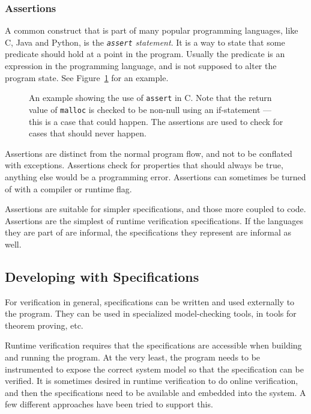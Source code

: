 \documentclass[a4paper,11pt]{kth-mag}
\begin{document}
\subsubsection{Assertions}

A common construct that is part of many popular programming languages, like C,
Java and Python, is the \textit{\texttt{assert} statement}. It is a way to
state that some predicate should hold at a point in the program. Usually the
predicate is an expression in the programming language, and is not supposed to
alter the program state. See Figure~\ref{figure-c-assert-example} for an
example.

\begin{figure}[h!]
	\begin{center}
	\begin{minipage}{0.7\textwidth}
    \lstset{language=C}
		
	\end{minipage}
	\end{center}
  \caption{An example showing the use of \texttt{assert} in C. Note that the
    return value of \texttt{malloc} is checked to be non-null using an
    if-statement --- this is a case that could happen. The assertions are used
    to check for cases that should never happen.}
	\label{figure-c-assert-example}
\end{figure}

Assertions are distinct from the normal program flow, and not to be conflated
with exceptions. Assertions check for properties that should always be true,
anything else would be a programming error. Assertions can sometimes be turned
of with a compiler or runtime flag.

Assertions are suitable for simpler specifications, and those more coupled to
code. Assertions are the simplest of runtime verification specifications. If
the languages they are part of are informal, the specifications they represent
are informal as well.


\subsection{Developing with Specifications}

For verification in general, specifications can be written and used externally
to the program. They can be used in specialized model-checking tools, in tools
for theorem proving, etc.

Runtime verification requires that the specifications are accessible when
building and running the program. At the very least, the program needs to be
instrumented to expose the correct system model so that the specification can
be verified. It is sometimes desired in runtime verification to do online
verification, and then the specifications need to be available and embedded
into the system. A few different approaches have been tried to support this.
\end{document}
